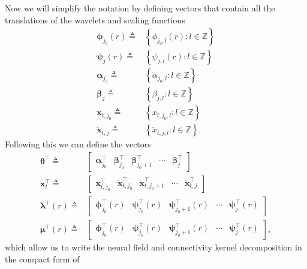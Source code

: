 \documentclass[review,authoryear,3p]{elsarticle}
\begin{document}
Now we will simplify the notation by defining vectors that contain all the translations of the wavelets and scaling functions 
\begin{align}      
	\boldsymbol\phi_{j_0}(r) \triangleq&\left\lbrace{\phi_{j_0,l}(r)}:l \in \mathbb{Z} \right\rbrace \\
	\boldsymbol\psi_{j}(r) \triangleq& \left\lbrace{\psi_{j,l}(r)}:l \in \mathbb{Z} \right\rbrace\\
	\boldsymbol\alpha_{j_0} \triangleq& \left\lbrace\alpha_{j_0, l}:l \in \mathbb{Z} \right\rbrace \\
	\boldsymbol\beta_{j} \triangleq& \left\lbrace\beta_{j, l}:l \in \mathbb{Z} \right\rbrace \\
	\mathbf{x}_{t,j_0} \triangleq& \left\lbrace{x}_{t,j_{0},l}:l \in \mathbb{Z} \right\rbrace \\
	\check{\mathbf{x}}_{t,j} \triangleq& \left\lbrace{\check{x}}_{t,j,l}:l \in \mathbb{Z} \right\rbrace.
\end{align}
Following this we can define the vectors 
\begin{align}
\boldsymbol\theta^\top \triangleq& [\begin{array}{ccccc} \boldsymbol\alpha_{j_0}^\top & \boldsymbol\beta_{j_0}^\top & \boldsymbol\beta_{j_0+1}^\top & \cdots & \boldsymbol\beta_{j}^\top \end{array}] 
\label{KernelWeights} \\
\mathbf{x}_{t}^\top \triangleq& [\begin{array}{ccccc}\mathbf{x}_{t,j_{0}}^\top &  \check{\mathbf{x}}_{t,j_{0}}^\top & \check{\mathbf{x}}_{t,j_{0}+1}^\top & \cdots & \check{\mathbf{x}}_{t,j}^\top\end{array}]
\label{FieldWeights} \\
\label{KernelBasisVector}
\boldsymbol\lambda^\top(r) \triangleq& \left[
\begin{array}{ccccc} \boldsymbol\phi_{j_0}^\top(r) &
\boldsymbol\psi_{j_0}^\top(r) & 
\boldsymbol\psi_{j_0+1}^\top(r) &
\cdots &
\boldsymbol\psi_{j}^\top(r)\end{array}\right] \\
\label{FieldBasisVector}
\boldsymbol\mu^\top (r) \triangleq& \left[
\begin{array}{ccccc}\boldsymbol\phi_{j_0}^\top(r) &
\boldsymbol\psi_{j_0}^\top(r) & 
\boldsymbol\psi_{j_0+1}^\top(r) &
\cdots &
\boldsymbol\psi_{j}^\top(r)\end{array}\right],
\end{align}
which allow us to write the neural field and connectivity kernel decomposition in the compact form of
\end{document}
